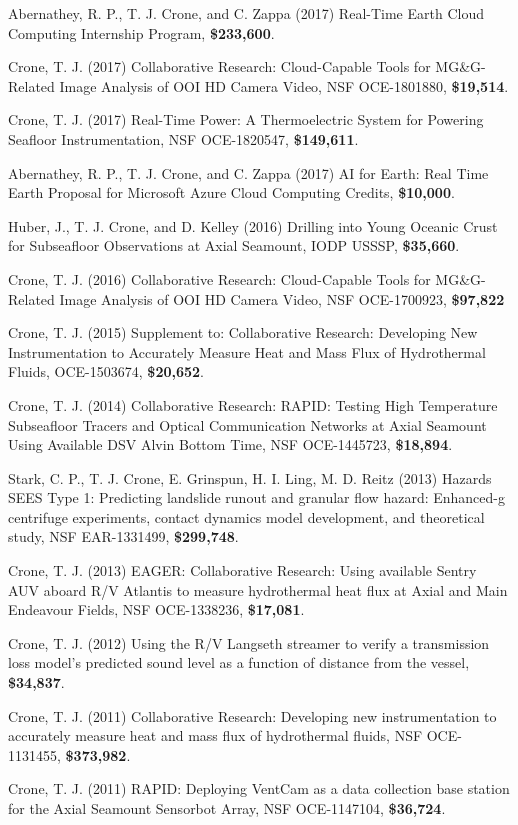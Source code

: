 \documentclass[11pt]{res}
\begin{document}
\begin{resume}
Abernathey, R. P., T. J. Crone, and C. Zappa (2017) Real-Time Earth Cloud Computing Internship Program, {\bf \$233,600}.

Crone, T. J. (2017) Collaborative Research: Cloud-Capable Tools for MG\&G-Related Image Analysis of OOI HD Camera Video, NSF OCE-1801880, {\bf \$19,514}.

Crone, T. J. (2017) Real-Time Power: A Thermoelectric System for Powering Seafloor Instrumentation, NSF OCE-1820547, {\bf \$149,611}.

Abernathey, R. P., T. J. Crone, and C. Zappa (2017) AI for Earth: Real Time Earth Proposal for Microsoft Azure Cloud Computing Credits, {\bf \$10,000}.

Huber, J., T. J. Crone, and D. Kelley (2016) Drilling into Young Oceanic Crust for Subseafloor Observations at Axial Seamount, IODP USSSP, {\bf \$35,660}.

Crone, T. J. (2016) Collaborative Research: Cloud-Capable Tools for MG\&G-Related Image Analysis of OOI HD Camera Video, NSF OCE-1700923, {\bf\$97,822}

Crone, T. J. (2015) Supplement to: Collaborative Research: Developing New Instrumentation to Accurately Measure Heat and Mass Flux of Hydrothermal Fluids, OCE-1503674, {\bf\$20,652}.

Crone, T. J. (2014) Collaborative Research: RAPID: Testing High Temperature Subseafloor Tracers and Optical Communication Networks at Axial Seamount Using Available DSV Alvin Bottom Time, NSF OCE-1445723, {\bf\$18,894}.

Stark, C. P., T. J. Crone, E. Grinspun, H. I. Ling, M. D. Reitz (2013) Hazards SEES Type 1: Predicting landslide runout and granular flow hazard: Enhanced-g centrifuge experiments, contact dynamics model development, and theoretical study, NSF EAR-1331499, {\bf\$299,748}.

Crone, T. J. (2013) EAGER: Collaborative Research: Using available Sentry AUV aboard R/V Atlantis to measure hydrothermal heat flux at Axial and Main Endeavour Fields, NSF OCE-1338236, {\bf\$17,081}.

Crone, T. J. (2012) Using the R/V Langseth streamer to verify a transmission loss model's predicted sound level as a function of distance from the vessel, {\bf\$34,837}. 

Crone, T. J. (2011) Collaborative Research: Developing new instrumentation to accurately measure heat and mass flux of hydrothermal fluids, NSF OCE-1131455, {\bf\$373,982}.

Crone, T. J. (2011) RAPID: Deploying VentCam as a data collection base station for the Axial Seamount Sensorbot Array, NSF OCE-1147104, {\bf\$36,724}.


\end{resume}
\end{document}
